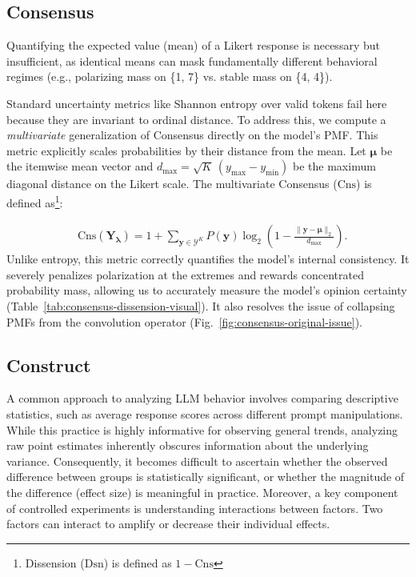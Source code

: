  
\subsection{Consensus}

Quantifying the expected value (mean) of a Likert response is necessary but insufficient, as identical means can mask fundamentally different behavioral regimes (e.g., polarizing mass on \{1, 7\} vs. stable mass on \{4, 4\}). 

Standard uncertainty metrics like Shannon entropy over valid tokens fail here because they are invariant to ordinal distance. 
To address this, we compute a \emph{multivariate} generalization of Consensus \citep{tastle2007consensus} directly on the model's PMF. This metric explicitly scales probabilities by their distance from the mean. Let $\boldsymbol{\mu}$ be the itemwise mean vector and $d_{\max}=\sqrt{K}\,(y_{\max}-y_{\min})$ be the maximum diagonal distance on the Likert scale. The multivariate Consensus ($\mathrm{Cns}$) is defined as\footnote{Dissension ($\mathrm{Dsn}$) is defined as $1 - \mathrm{Cns}$}:

{\small
\begin{equation}
\label{eq:consensus-multivariate}
\begin{aligned}
&\mathrm{Cns}(\mathbf{Y}_{\boldsymbol{\lambda}})
=
1+\sum_{\mathbf{y}\in\mathcal{Y}^K}
P(\mathbf{y})
\log_2\!\left(1-\frac{\|\mathbf{y}-\boldsymbol{\mu}\|_2}{d_{\max}}\right).
\end{aligned}
\end{equation}
}
Unlike entropy, this metric correctly quantifies the model's internal consistency. 
It severely penalizes polarization at the extremes and rewards concentrated probability mass, allowing us to accurately measure the model's opinion certainty (Table~\ref{tab:consensus-dissension-visual}).
It also resolves the issue of collapsing PMFs from the convolution operator (Fig.~\ref{fig:consensus-original-issue}).


\subsection{Construct}

A common approach to analyzing LLM behavior involves comparing descriptive statistics, such as average response scores across different prompt manipulations. 
While this practice is highly informative for observing general trends, analyzing raw point estimates inherently obscures information about the underlying variance. 
Consequently, it becomes difficult to ascertain whether the observed difference between groups is statistically significant, or whether the magnitude of the difference (effect size) is meaningful in practice.
Moreover, a key component of controlled experiments is understanding interactions between factors. 
Two factors can interact to amplify or decrease their individual effects. 

